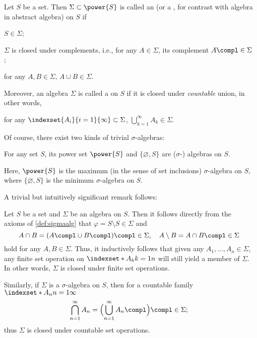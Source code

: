 \begin{definition}
    \label{def:sigmaalg}
    Let \(S\) be a set.
    Then \(\Sigma\subset\power{S}\) is called
    an 
    (or a ,
    for contrast with algebra in abstract algebra)
    on \(S\) if
    \begin{axioms}
        \item \(S\in\Sigma\);
        \item \(\Sigma\) is closed under complements,
        i.e., for any \(A\in\Sigma\),
        its complement \(A\compl\in\Sigma\);
        \item for any \(A,B\in\Sigma\), \(A\cup B\in\Sigma\).
    \end{axioms}
    Moreover, an algebra \(\Sigma\) is called
    a  on \(S\)
    if it is closed under \emph{countable} union,
    in other words,
    \begin{axioms}
        \setcounter{enumi}{3}
        \item for any \(\indexset{A_i}{i=1}{\infty}\subset\Sigma\),
        \(\bigcup_{k=1}^\infty A_k\in\Sigma\).
    \end{axioms}
\end{definition}

Of course, there exist two kinds of trivial \(\sigma\)-algebras:
\begin{example}
    \label{exm:trivialsigma}
    For any set \(S\),
    its power set \(\power{S}\)
    and \(\{\varnothing,S\}\) are (\(\sigma\)-) algebras on \(S\).
\end{example}
Here, \(\power{S}\) is the maximum (in the sense of set inclusions)
\(\sigma\)-algebra on \(S\),
where \(\{\varnothing,S\}\) is the minimum \(\sigma\)-algebra on \(S\).

A trivial but intuitively significant remark follows:
\begin{remark}
    \label{rem:sigmaalg}
    Let \(S\) be a set and \(\Sigma\) be an algebra on \(S\).
    Then it follows directly from the axioms of \cref{def:sigmaalg} that
    \(\varphi=S\setminus S\in\Sigma\)
    and
    \[
        A\cap B
        =(A\compl\cup B\compl)\compl
        \in\Sigma,
        \quad
        A\setminus B
        =A\cap B\compl
        \in\Sigma
    \]
    hold for any \(A,B\in\Sigma\).
    Thus, it inductively follows that
    given any \(A_1,\dots,A_n\in\Sigma\),
    any finite set operation on \(\indexset*{A_k}{k=1}{n}\)
    will still yield a member of \(\Sigma\).
    In other words,
    \(\Sigma\) is closed under finite set operations.
    
    Similarly, if \(\Sigma\) is a \(\sigma\)-algebra on \(S\),
    then for a countable family \(\indexset*{A_n}{n=1}{\infty}\)
    \[
        \bigcap_{n=1}^\infty A_n
        =\Bigl(\bigcup_{n=1}^\infty A_n\compl\Bigr)\compl
        \in\Sigma;
    \]
    thus \(\Sigma\) is closed under countable set operations.
\end{remark}

